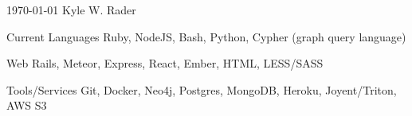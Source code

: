 \documentclass[11pt, a4paper]{awesome-cv}
\begin{document}
\makecvheader

\makecvfooter
  {\today}
  {Kyle W. Rader}
  {\thepage}

\begin{cvskills}
  \cvskill
    {Current Languages} %
    {Ruby, NodeJS, Bash, Python, Cypher (graph query language)} %

  \cvskill
    {Web} %
    {Rails, Meteor, Express, React, Ember, HTML, LESS/SASS} %

  \cvskill
    {Tools/Services} %
    {Git, Docker, Neo4j, Postgres, MongoDB, Heroku, Joyent/Triton, AWS S3 } %
\end{cvskills}
\end{document}
